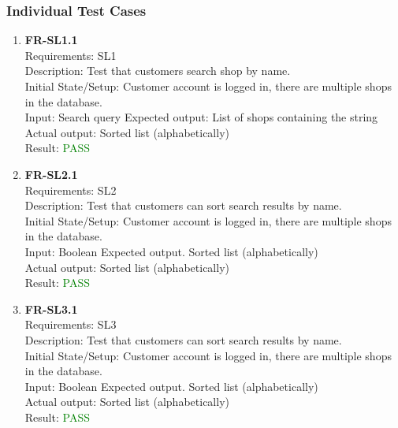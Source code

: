 \documentclass[12pt, titlepage]{article}
\newcommand{\testpass}{\textcolor{green}{PASS}}
\begin{document}
        \subsubsection{Individual Test Cases}
            \begin{enumerate}
                \item \textbf{FR-SL1.1} \label{FR-SL1.1} \\ Requirements: SL1 \\
                    Description: Test that customers search shop by name. \\
                    Initial State/Setup: Customer account is logged in, there are multiple shops in the database. \\
                    Input: Search query
                    Expected output: List of shops containing the string\\
                    Actual output: Sorted list (alphabetically)\\
                    Result: \testpass
                    
                    
                \item \textbf{FR-SL2.1} \label{FR-SL2.1} \\ Requirements: SL2 \\
                    Description: Test that customers can sort search results by name. \\
                    Initial State/Setup: Customer account is logged in, there are multiple shops in the database. \\
                    Input: Boolean
                    Expected output. Sorted list (alphabetically)\\
                    Actual output: Sorted list (alphabetically)\\
                    Result: \testpass
                    
                    
                \item \textbf{FR-SL3.1} \label{FR-SL3.1} \\ Requirements: SL3 \\
                    Description: Test that customers can sort search results by name. \\
                    Initial State/Setup: Customer account is logged in, there are multiple shops in the database. \\
                    Input: Boolean
                    Expected output. Sorted list (alphabetically)\\
                    Actual output: Sorted list (alphabetically)\\
                    Result: \testpass
                    

\end{enumerate}
\end{document}
